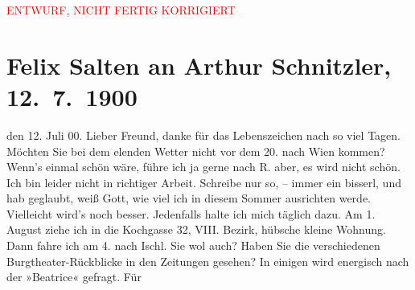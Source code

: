 
\begin{center}
            \textcolor{red}{ENTWURF, NICHT FERTIG KORRIGIERT}
                      \end{center}
            
         
         \renewcommand{\erwaehntePersonen}{Personen: Paul Schlenther}
         \renewcommand{\erwaehnteInstitutionen}{Institutionen: Burgtheater}
         \renewcommand{\erwaehnteOrte}{Orte: Bad Ischl, Kochgasse, Reichenau an der Rax, Wien}
         \renewcommand{\erwaehnteWerke}{Werke: Der Schleier der Beatrice. Schauspiel in fünf Akten}
               \section[Felix Salten an Arthur Schnitzler, 12. 7. 1900]{ Felix Salten an Arthur Schnitzler, 12. 7. 1900}\nopagebreak{}\rehead{ }\begin{ledgroupsized}[t]{13cm}\normalsize\beginnumbering \toendnotes[C]{\smallbreak\pagebreak[2]} 
\toendnotes[C]{\smallbreak}\pstart
           \raggedleft{}{\pb}den 12. Juli
                  00. \pend
           \pstart
           Lieber Freund, danke für das Lebenszeichen nach so viel Tagen.
               Möchten Sie bei dem elenden Wetter nicht vor dem 20. nach Wien kommen? Wenn’s einmal schön wäre, führe ich ja
               gerne nach R. aber, es wird nicht schön. Ich bin
               leider nicht in richtiger Arbeit. Schreibe nur so, – immer ein bisserl, und hab
               geglaubt, weiß Gott, wie viel ich in diesem Sommer ausrichten werde. Vielleicht
               wird's noch besser. Jedenfalls halte ich mich täglich dazu. Am 1. August
               ziehe ich in die Kochgasse 32, VIII. Bezirk,
               hübsche kleine Wohnung. Dann fahre ich am 4. nach Ischl. Sie wol auch? Haben Sie die verschiedenen Burgtheater-Rückblicke in den Zeitungen gesehen? In einigen
               wird energisch nach der »Beatrice« gefragt. Für

\end{ledgroupsized}
